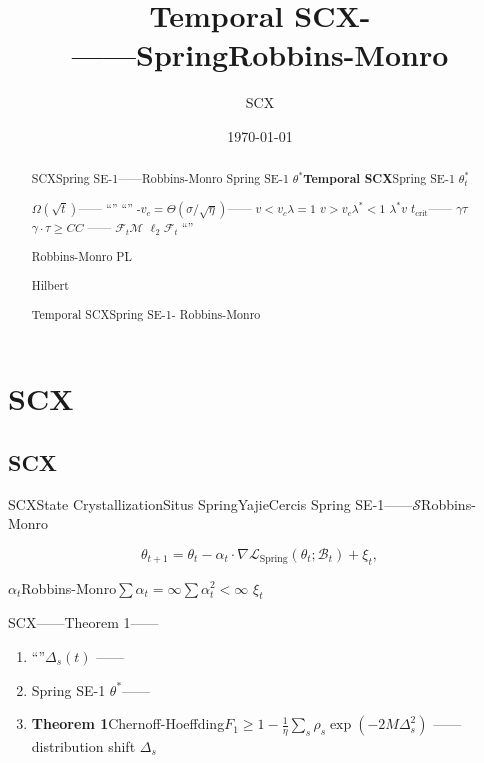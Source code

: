 \documentclass[11pt,a4paper]{article}
\title{\textbf{\LARGE Temporal SCX-}\\[6pt]
       ——SpringRobbins-Monro}
\author{SCX}\\
\date{\today}
\theoremstyle{remark}
\newcommand{\Sstates}{\mathcal{S}}
\newcommand{\Mmem}{\mathcal{M}}
\newcommand{\Fforget}{\mathcal{F}}
\begin{document}
\maketitle

\begin{abstract}
SCXSpring SE-1——Robbins-Monro
Spring SE-1\cite{scx2026spring_convergence}\textbf{}
$\theta^*$\textbf{Temporal SCX}Spring SE-1
\textbf{}$\theta_t^*$

\textbf{}
$\Omega(\sqrt{t})$——
\textbf{}
\cite{scx2026theorems}``''
``''
\textbf{}-$v_c = \Theta(\sigma/\sqrt{\eta})$——
$v < v_c$$\lambda = 1$
$v > v_c$$\lambda^* < 1$
$\lambda^*$$v$\cite{scx2026theorems}
$t_{\text{crit}}$——
\textbf{}$\gamma$$\tau$
$\gamma \cdot \tau \geq C$$C$
——\textbf{}
\textbf{}$\Fforget_t$$\Mmem$
$\ell_2$$\Fforget_t$
``''


Robbins-Monro
PL

Hilbert

\textbf{}Temporal SCXSpring SE-1-
Robbins-Monro
\end{abstract}

\section{SCX}

\subsection{SCX}

SCXState CrystallizationSitus
SpringYajieCercis
Spring SE-1——$\Sstates$Robbins-Monro

\begin{equation}\label{eq:spring_se1}
    \theta_{t+1} = \theta_t - \alpha_t \cdot \nabla\mathcal{L}_{\text{Spring}}(\theta_t; \mathcal{B}_t) + \xi_t,
\end{equation}

$\alpha_t$Robbins-Monro$\sum \alpha_t = \infty$$\sum \alpha_t^2 < \infty$
$\xi_t$

SCX——Theorem 1——
\textbf{}

\begin{enumerate}[label=(\arabic*)]
    \item \textbf{}``''$\Delta_s(t)$
          ——\textbf{}
          \textbf{}
    \item \textbf{}Spring SE-1
          $\theta^*$——\textbf{}
          \textbf{}
    \item \textbf{Theorem 1}Chernoff-Hoeffding$F_1 \geq 1 - \frac{1}{\eta}\sum_s \rho_s \exp(-2M\Delta_s^2)$
          ——distribution shift
          $\Delta_s$
\end{enumerate}
\end{document}
